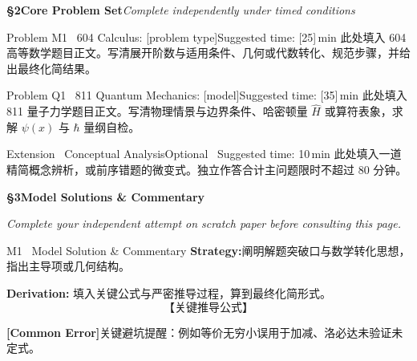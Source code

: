 \documentclass[a4paper,11pt]{article}
\newcommand{\alerttag}[1]{\textcolor{wine}{\sffamily\bfseries [#1]}}
\begin{document}
\clearpage

{\Large\sffamily\bfseries\color{navy} \S 2\quad Core Problem Set}\hfill{\small\sffamily\color{mist}\itshape Complete independently under timed conditions}

\vspace{8pt}

\begin{problem}{Problem M1 \textbar\ 604 Calculus: [problem type]}{Suggested time: [25]\,min}
此处填入 604 高等数学题目正文。写清展开阶数与适用条件、几何或代数转化、规范步骤，并给出最终化简结果。
\end{problem}

\vspace{6pt}

\begin{problem}{Problem Q1 \textbar\ 811 Quantum Mechanics: [model]}{Suggested time: [35]\,min}
此处填入 811 量子力学题目正文。写清物理情景与边界条件、哈密顿量 $\hat{H}$ 或算符表象，求解 $\psi(x)$ 与 $\hbar$ 量纲自检。
\end{problem}

\vspace{6pt}

\begin{problem}{Extension \textbar\ Conceptual Analysis}{Optional \textperiodcentered\ Suggested time: 10\,min}
此处填入一道精简概念辨析，或前序错题的微变式。独立作答合计主问题限时不超过 80 分钟。
\end{problem}

\clearpage

{\Large\sffamily\bfseries\color{navy} \S 3\quad Model Solutions \& Commentary}

\vspace{1pt}
{\small\color{mist}\itshape\hspace{1pt} Complete your independent attempt on scratch paper before consulting this page.}

\vspace{8pt}

\begin{solution}{M1 \textperiodcentered\ Model Solution \& Commentary}
\textbf{Strategy:}\enspace 阐明解题突破口与数学转化思想，指出主导项或几何结构。

\vspace{2mm}
\textbf{Derivation:}\enspace
填入关键公式与严密推导过程，算到最终化简形式。
\[
  \text{【关键推导公式】}
\]

\begin{warnbox}
\alerttag{Common Error}\enspace 关键避坑提醒：例如等价无穷小误用于加减、洛必达未验证未定式。
\end{warnbox}
\end{solution}
\end{document}
